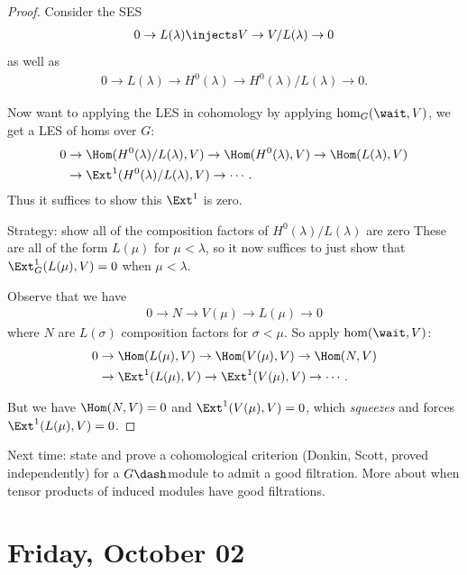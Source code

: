\begin{proof}

Consider the SES
\begin{align*}  
0 \to L(\lambda) \injects V \to V/L(\lambda) \to 0
\end{align*} as well as
\begin{align*}  
0 \to L(\lambda) \to H^0(\lambda) \to H^0(\lambda)/L(\lambda) \to 0
.\end{align*}

Now want to applying the LES in cohomology by applying
\(\hom_G(\wait, V)\), we get a LES of homs over \(G\):
\begin{align*}  
0 &\to \Hom(H^0(\lambda)/L(\lambda), V) \to
\Hom(H^0(\lambda) , V) \to
\Hom(L(\lambda), V)  \\
&\to \Ext^1(H^0(\lambda)/L(\lambda), V) \to \cdots
.\end{align*} Thus it suffices to show this \(\Ext^1\) is zero.

Strategy: show all of the composition factors of
\(H^0(\lambda)/L(\lambda)\) are zero These are all of the form
\(L(\mu)\) for \(\mu < \lambda\), so it now suffices to just show that
\(\Ext_G^1(L(\mu), V) = 0\) when \(\mu < \lambda\).

Observe that we have
\begin{align*}  
0 \to N \to V(\mu) \to L(\mu) \to 0
\end{align*} where \(N\) are \(L(\sigma)\) composition factors for
\(\sigma < \mu\). So apply \(\hom(\wait, V)\):
\begin{align*}  
0 
&\to
\Hom(L(\mu), V) \to
\Hom(V(\mu), V) \to
\Hom(N, V) \\
&\to
\Ext^1(L(\mu), V) \to
\Ext^1(V(\mu), V) \to \cdots
.\end{align*}

But we have \(\Hom(N, V) =0\) and \(\Ext^1(V(\mu), V) = 0\), which
\emph{squeezes} and forces \(\Ext^1(L(\mu), V) = 0\).

\end{proof}

Next time: state and prove a cohomological criterion (Donkin, Scott,
proved independently) for a \(G\dash\)module to admit a good filtration.
More about when tensor products of induced modules have good
filtrations.

\hypertarget{friday-october-02}{%
\section{Friday, October 02}\label{friday-october-02}}

